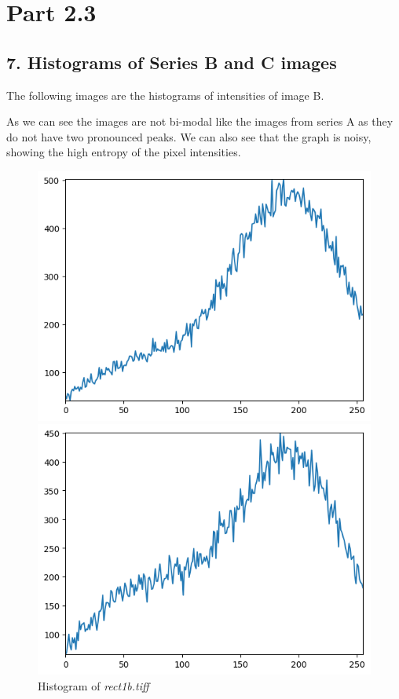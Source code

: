 \documentclass[runningheads]{llncs}
\begin{document}
\section*{Part 2.3}
\subsection*{7. Histograms of Series B and C images}
The following images are the histograms of intensities of image B. 
\par As we can see the images are not bi-modal like the images from series A as they do not have two pronounced peaks. We can also see that the graph is noisy, showing the high entropy of the pixel intensities.
\begin{figure}[h]
\begin{minipage}[h]{0.47\linewidth}
\begin{center}
\includegraphics[width=1\linewidth]{Report/Result_Images/histogram_1b.png} 
\caption{Histogram of \emph{rect1b.tiff}}
\label{1b-histogram}
\end{center} 
\end{minipage}
\hfill
\vspace{0.2 cm}
\begin{minipage}[h]{0.47\linewidth}
\begin{center}
\includegraphics[width=1\linewidth]{Report/Result_Images/histogram_2b.png} 

\end{center}
\end{minipage}
\end{figure}
\end{document}
